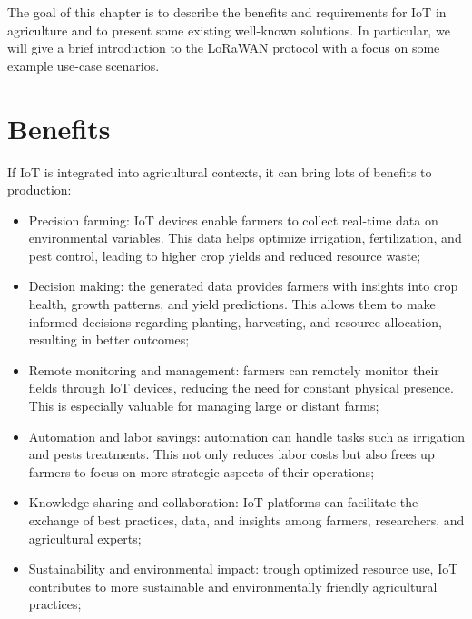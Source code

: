 

The goal of this chapter is to describe the benefits and requirements for \gls{IoT} in agriculture and to
present some existing well-known solutions. In particular, we will give a brief introduction to the \gls{LoRaWAN}
protocol with a focus on some example use-case scenarios.

\section{Benefits}
\label{sec: benefits}
If \gls{IoT} is integrated into agricultural contexts, it can bring lots of benefits to production:
\begin{itemize}
    \item Precision farming: IoT devices enable farmers to collect real-time data on environmental variables. This data
        helps optimize irrigation, fertilization, and pest control, leading to higher crop yields and reduced resource
        waste;
    \item Decision making: the generated data provides farmers with insights into crop health, growth
        patterns, and yield predictions. This allows them to make informed decisions regarding planting, harvesting, and
        resource allocation, resulting in better outcomes;
    \item Remote monitoring and management: farmers can remotely monitor their fields through IoT devices,
        reducing the need for constant physical presence. This is especially valuable for managing large or distant
        farms;
    \item Automation and labor savings: automation can handle tasks such as irrigation and pests
        treatments. This not only reduces labor costs but also frees up farmers to focus on more strategic aspects of
        their operations;
    \item Knowledge sharing and collaboration: IoT platforms can facilitate the exchange of best practices, data, and
        insights among farmers, researchers, and agricultural experts;
    \item Sustainability and environmental impact: trough optimized resource use, IoT contributes to more sustainable
        and environmentally friendly agricultural practices;
\end{itemize}

